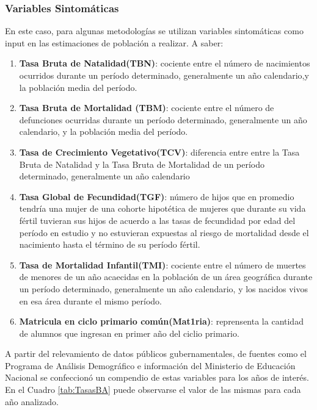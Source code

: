 \documentclass{article}
\theoremstyle{mytheoremstyle}
\theoremstyle{mytheoremstyle}
\theoremstyle{myproblemstyle}
\begin{document}
\subsubsection{Variables Sintomáticas}
En este caso, para algunas metodologías se utilizan variables sintomáticas como input en las
 estimaciones de población a realizar. A saber:
 \begin{enumerate}
    \item \textbf{Tasa Bruta de Natalidad(TBN)}: cociente entre el número de nacimientos ocurridos durante un período determinado, 
  generalmente un año calendario,y la población media del período.
   \item	\textbf{Tasa Bruta de Mortalidad (TBM)}:  cociente entre el número de defunciones ocurridas durante un período determinado, 
   generalmente un año calendario, y la población media del período.
       \item \textbf{Tasa de Crecimiento Vegetativo(TCV)}: diferencia entre entre la Tasa Bruta de Natalidad 
   y la Tasa Bruta de Mortalidad de un período determinado, generalmente un año calendario
   \item \textbf{Tasa Global de Fecundidad(TGF)}: número de hijos que en promedio tendría una mujer de
   una cohorte hipotética de mujeres que durante su vida fértil tuvieran sus hijos de acuerdo 
   a las tasas de fecundidad por edad del período en estudio y no estuvieran expuestas al
   riesgo de mortalidad desde el nacimiento hasta el término de su período fértil.
    \item \textbf{Tasa de Mortalidad Infantil(TMI)}: cociente entre el número de muertes de menores de un año acaecidas 
   en la población de un área geográfica durante un período determinado, 
   generalmente un año calendario, y los nacidos vivos en esa área durante el mismo período.
    \item \textbf{Matricula en ciclo primario común(Mat1ria)}: reprensenta la cantidad de alumnos
   que ingresan en primer año del ciclio primario.
  \end{enumerate}
 
A partir del relevamiento de datos públicos gubernamentales, de fuentes como el  Programa de Análisis Demográfico  e 
información del Ministerio de Educación Nacional   se confeccionó un compendio de estas variables para los años de interés.
En el Cuadro \ref{tab:TasasBA} puede observarse el valor de las mismas para cada año analizado.\newline
 
\end{document}
